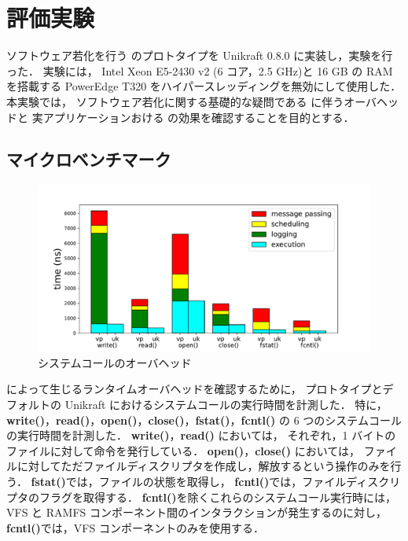 \section{評価実験} \label{sec:evaluation}


ソフトウェア若化を行う \sysname のプロトタイプを Unikraft 0.8.0 に実装し，実験を行った．
実験には，
Intel Xeon E5-2430 v2 (6 コア，2.5 GHz)と 16 GB の RAM を搭載する
PowerEdge T320 をハイパースレッディングを無効にして使用した．
本実験では，
ソフトウェア若化に関する基礎的な疑問である
\sysname に伴うオーバヘッドと
実アプリケーションおける \sysname の効果を確認することを目的とする．

\subsection{マイクロベンチマーク}

\begin{figure}[!t]
    \centering
    \includegraphics[width=\linewidth]{img/syscall-time.pdf}
    \caption{システムコールのオーバヘッド}
    \label{fig:func-time}
\end{figure}

\sysname によって生じるランタイムオーバヘッドを確認するために，
プロトタイプとデフォルトの Unikraft におけるシステムコールの実行時間を計測した．
特に，
\textbf{write()}，\textbf{read()}，\textbf{open()}，\textbf{close()}，\textbf{fstat()}，\textbf{fcntl()} の 6 つのシステムコールの実行時間を計測した．
\textbf{write()}，\textbf{read()} においては，
それぞれ，1 バイトのファイルに対して命令を発行している．
\textbf{open()}，\textbf{close()} においては，
ファイルに対してただファイルディスクリプタを作成し，解放するという操作のみを行う．
\textbf{fstat()}では，ファイルの状態を取得し，
\textbf{fcntl()}では，ファイルディスクリプタのフラグを取得する．
\textbf{fcntl()}を除くこれらのシステムコール実行時には，VFS と RAMFS コンポーネント間のインタラクションが発生するのに対し，
\textbf{fcntl()}では，VFS コンポーネントのみを使用する．



